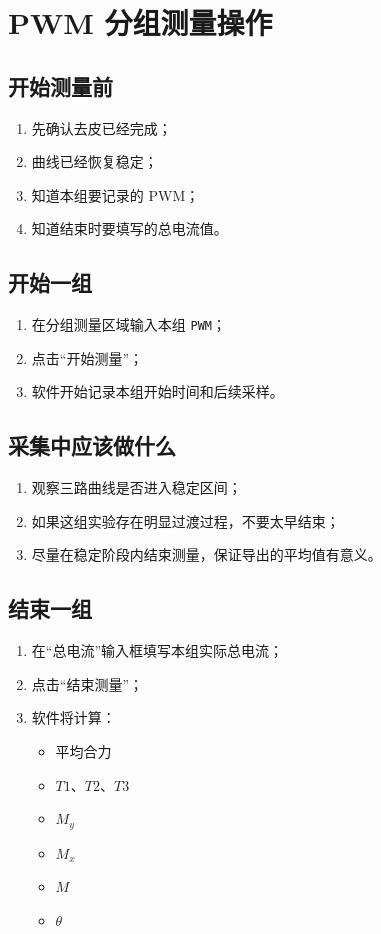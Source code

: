 \documentclass[11pt,a4paper]{ctexart}
\begin{document}
\section{PWM 分组测量操作}

\subsection{开始测量前}

\begin{enumerate}[leftmargin=2em]
  \item 先确认去皮已经完成；
  \item 曲线已经恢复稳定；
  \item 知道本组要记录的 PWM；
  \item 知道结束时要填写的总电流值。
\end{enumerate}

\subsection{开始一组}

\begin{enumerate}[leftmargin=2em]
  \item 在分组测量区域输入本组 \texttt{PWM}；
  \item 点击“开始测量”；
  \item 软件开始记录本组开始时间和后续采样。
\end{enumerate}

\subsection{采集中应该做什么}

\begin{enumerate}[leftmargin=2em]
  \item 观察三路曲线是否进入稳定区间；
  \item 如果这组实验存在明显过渡过程，不要太早结束；
  \item 尽量在稳定阶段内结束测量，保证导出的平均值有意义。
\end{enumerate}

\subsection{结束一组}

\begin{enumerate}[leftmargin=2em]
  \item 在“总电流”输入框填写本组实际总电流；
  \item 点击“结束测量”；
  \item 软件将计算：
  \begin{itemize}[leftmargin=2em]
    \item 平均合力
    \item \(T1\)、\(T2\)、\(T3\)
    \item \(M_y\)
    \item \(M_x\)
    \item \(M\)
    \item \(\theta\)
  \end{itemize}
\end{enumerate}
\end{document}
